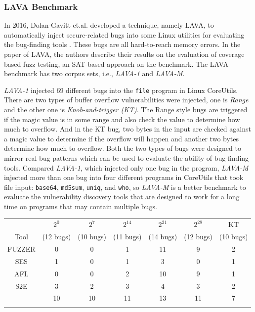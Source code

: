 \subsubsection{LAVA Benchmark}
In 2016, Dolan-Gavitt et.al. developed a technique, namely LAVA, to 
automatically inject secure-related bugs into some Linux utilities for 
evaluating the bug-finding tools \cite{dolan2016lava}. These bugs are 
all hard-to-reach memory errors. In the paper of LAVA, the authors describe 
their results on the evaluation of coverage based fuzz testing, an SAT-based 
approach on the benchmark. The LAVA benchmark has two corpus sets, 
i.e., \textit{LAVA-1} and \textit{LAVA-M}.

\textit{LAVA-1} injected 69 different bugs into the \texttt{file} program 
in Linux CoreUtils. There are two types of buffer overflow vulnerabilities 
were injected, one is \emph{Range} and the other one is 
\emph{Knob-and-trigger (KT)}. The Range style bugs are triggered if the 
magic value is in some range and also check the value to determine how much 
to overflow. And in the KT bug, two bytes in the input are checked against 
a magic value to determine if the overflow will happen and another two bytes 
determine how much to overflow. Both the two types of bugs were designed to 
mirror real bug patterns which can be used to evaluate the ability of 
bug-finding tools. Compared \textit{LAVA-1}, which injected only one bug 
in the program, \textit{LAVA-M} injected more than one bug into four 
different programs in CoreUtils that took file input: \texttt{base64}, 
\texttt{md5sum}, \texttt{uniq}, and \texttt{who}, so \textit{LAVA-M} is a 
better benchmark to evaluate the vulnerability discovery tools that are 
designed to work for a long time on programs that may contain multiple bugs.

\begin{table}[!b]
{\begin{tabular*}{20pc}{@{\extracolsep{\fill}}ccccccc@{\extracolsep{\fill}}}\toprule
& $2^0$ & $2^7$  & $2^{14}$ & $2^{21}$ & $2^{28}$ & KT \\
	      Tool   & (12 bugs) & (10 bugs) & (11 bugs) & (14 bugs) & (12 bugs) & (10 bugs)\\
\midrule
		FUZZER 		& 0   & 0   & 1    & 11    & 9     & 2  \\
		SES	        & 1   & 0   & 1    & 3     & 0     & 1  \\
		AFL		    & 0   & 0   & 2    & 10    & 9     & 1   \\
		S2E			& 3   & 2   & 3    & 4     & 3     & 2   \\
		\prototype	& 10  & 10  & 11   & 13    & 11    & 7   \\
\botrule
\end{tabular*}}{}
\end{table}

